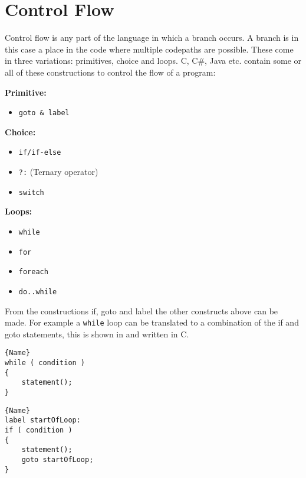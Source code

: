 \section{Control Flow}\label{subsec:control-flow}
Control flow is any part of the language in which a branch occurs. 
A branch is in this case a place in the code where multiple codepaths are possible. 
These come in three variations: primitives, choice and loops.
C, C\#, Java etc. contain some or all of these constructions to control the flow of a program:

\textbf{Primitive:}
\begin{itemize}[noitemsep,topsep=-5pt] %
    \item \texttt{goto \& label}
\end{itemize}

\textbf{Choice:}
\begin{itemize}[noitemsep,topsep=-5pt] %
    \item \texttt{if/if-else}
    \item \texttt{?:} (Ternary operator)
    \item \texttt{switch}
\end{itemize}

\textbf{Loops:}
\begin{itemize}[noitemsep,topsep=-5pt] %
    \item \texttt{while}
    \item \texttt{for}
    \item \texttt{foreach}
    \item \texttt{do..while}
\end{itemize}

From the constructions if, goto and label the other constructs above can be made.
For example a \texttt{while} loop can be translated to a combination of the if and goto statements, this is shown in  and  written in C. 

\noindent\begin{minipage}{.45\textwidth}
\begin{lstlisting}[caption=Loop made with while.,frame=tlrb, label=ifgotowhile1, numbers=none]{Name}
while ( condition )
{
    statement();
}
\end{lstlisting}
\end{minipage}\hfill
\begin{minipage}{.45\textwidth}
\begin{lstlisting}[caption=The same loop with if and goto.,frame=tlrb, label=ifgotowhile2, numbers=none]{Name}
label startOfLoop:
if ( condition )
{
    statement();
    goto startOfLoop;
}
\end{lstlisting}
\end{minipage}


